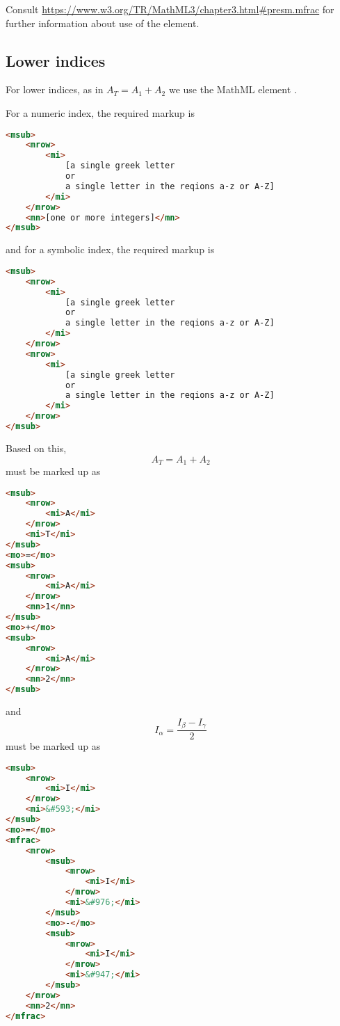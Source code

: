 \documentclass[english,a4paper,11pt]{article}
\begin{document}
\bigskip
Consult \url{https://www.w3.org/TR/MathML3/chapter3.html#presm.mfrac} for further information about use of the  element. 

\subsection{Lower indices}

For lower indices, as in $A_T = A_1 + A_2$ we use the MathML element .

For a numeric index, the required markup is 
\begin{lstlisting}[language=HTML]
<msub>
	<mrow>
		<mi>
			[a single greek letter 
			or 
			a single letter in the reqions a-z or A-Z]
		</mi>
	</mrow>
	<mn>[one or more integers]</mn>
</msub>
\end{lstlisting}
and for a symbolic index, the required markup is 
\begin{lstlisting}[language=HTML]
<msub>
	<mrow>
		<mi>
			[a single greek letter 
			or 
			a single letter in the reqions a-z or A-Z]
		</mi>
	</mrow>
	<mrow>
		<mi>
			[a single greek letter 
			or 
			a single letter in the reqions a-z or A-Z]
		</mi>
	</mrow>
</msub>
\end{lstlisting}

\begin{eksempler}
Based on this,
	\begin{equation} A_T = A_1 + A_2 \end{equation}
	must be marked up as
\begin{lstlisting}[language=HTML]
<msub>
	<mrow>
		<mi>A</mi>
	</mrow>
	<mi>T</mi>
</msub>
<mo>=</mo>
<msub>
	<mrow>
		<mi>A</mi>
	</mrow>
	<mn>1</mn>
</msub>
<mo>+</mo>
<msub>
	<mrow>
		<mi>A</mi>
	</mrow>
	<mn>2</mn>
</msub>
\end{lstlisting}
and
	\begin{equation} I_\alpha = \frac{I_\beta - I_\gamma}{2} \end{equation}
must be marked up as
\begin{lstlisting}[language=HTML]
<msub>
	<mrow>
		<mi>I</mi>
	</mrow>
	<mi>&#593;</mi>
</msub>
<mo>=</mo>
<mfrac>
	<mrow>
		<msub>
			<mrow>
				<mi>I</mi>
			</mrow>
			<mi>&#976;</mi>
		</msub>
		<mo>-</mo>
		<msub>
			<mrow>
				<mi>I</mi>
			</mrow>
			<mi>&#947;</mi>
		</msub>
	</mrow>
	<mn>2</mn>
</mfrac>
\end{lstlisting}
	
\end{eksempler}
\end{document}
